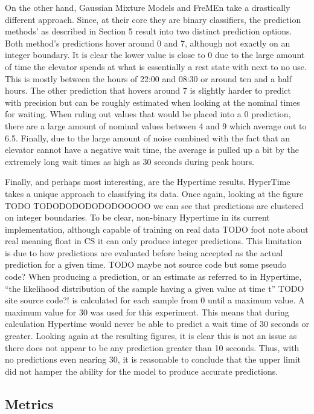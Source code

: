 On the other hand, Gaussian Mixture Models and FreMEn take a drastically
different approach.  Since, at their core they are binary classifiers, the
prediction methods' as described in Section 5 result into two distinct
prediction options. Both method's predictions hover around 0 and 7, although
not exactly on an integer boundary. It is clear the lower value is close to 0
due to the large amount of time the elevator spends at what is essentially a
rest state with next to no use. This is mostly between the hours of 22:00 and
08:30 or around ten and a half hours. The other prediction that hovers around 7
is slightly harder to predict with precision but can be roughly estimated when
looking at the nominal times for waiting. When ruling out values that would be
placed into a 0 prediction, there are a large amount of nominal values between 4
and 9 which average out to 6.5. Finally, due to the large amount of noise
combined with the fact that an elevator cannot have a negative wait time,
the average is pulled up a bit by the extremely long wait times as high as 30 seconds during peak hours.

Finally, and perhaps most interesting, are the Hypertime results. HyperTime takes a
unique approach to classifying its data. Once again, looking at the figure TODO TODODODODODODOOOOO
we can see that predictions are clustered on integer boundaries. To be clear,
non-binary Hypertime in its current implementation, although capable of training
on real data TODO foot note about real meaning float in CS it can only produce
integer predictions. This limitation is due to how predictions are evaluated
before being accepted as the actual prediction for a given time. TODO maybe
not source code but some pseudo code? When producing a prediction, or an
estimate as referred to in Hypertime, ``the likelihood distribution of the
sample having a given value at time t'' TODO site source code?! is calculated
for each sample from 0 until a maximum value. A maximum value for 30 was used
for this experiment. This means that during calculation Hypertime would never
be able to predict a wait time of 30 seconds or greater. Looking again at the
resulting figures, it is clear this is not an issue as there does not appear to
be any prediction greater than 10 seconds. Thus, with no predictions even
nearing 30, it is reasonable to conclude that the upper limit did not hamper the ability for
the model to produce accurate predictions.

\subsection{ Metrics }

